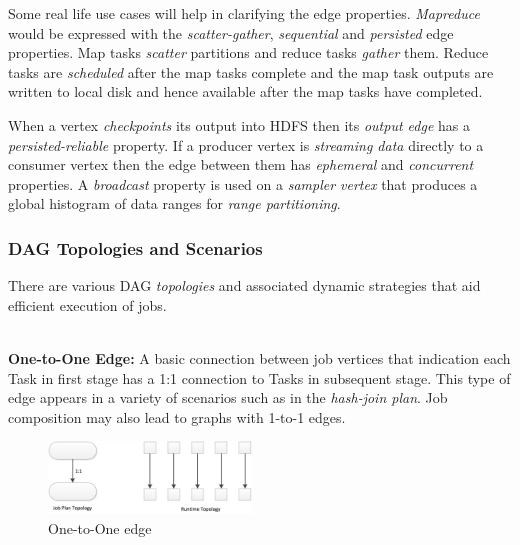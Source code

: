 \documentclass[twocolumn]{article}
\begin{document}
Some real life use cases will help in clarifying the edge properties.
\emph{Mapreduce} would be expressed with the \emph{scatter-gather},
\emph{sequential} and \emph{persisted} edge properties. Map
tasks \emph{scatter} partitions and reduce tasks \emph{gather} them.
Reduce tasks are \emph{scheduled} after the map tasks complete
and the map task outputs are written to local disk and hence available
after the map tasks have completed. 

When a vertex \emph{checkpoints} its output into HDFS then its \emph{output edge} has a
\emph{persisted-reliable} property. If a producer vertex is
\emph{streaming data} directly to a consumer vertex then the edge
between them has \emph{ephemeral} and \emph{concurrent} properties. A
\emph{broadcast} property is used on a \emph{sampler vertex} that
produces a global histogram of data ranges for \emph{range
partitioning}.


\subsubsection*{DAG Topologies and Scenarios}
There are various DAG \textit{topologies} and associated dynamic strategies that aid efficient execution of jobs.   

\noindent
\\
\textbf{One-to-One Edge:}  A basic connection between job vertices that indication each Task in first stage has a 1:1 connection to Tasks in subsequent stage.
This type of edge appears in a variety of scenarios such as in the \textit{hash-join plan}.  Job composition may also lead to graphs with 1-to-1 edges.  

\begin{figure}[htb]
        \centering
        \includegraphics[width=0.48\textwidth]{one-to-one}
        \caption{One-to-One edge}
        \label{one-to-one}
\end{figure}
\end{document}
